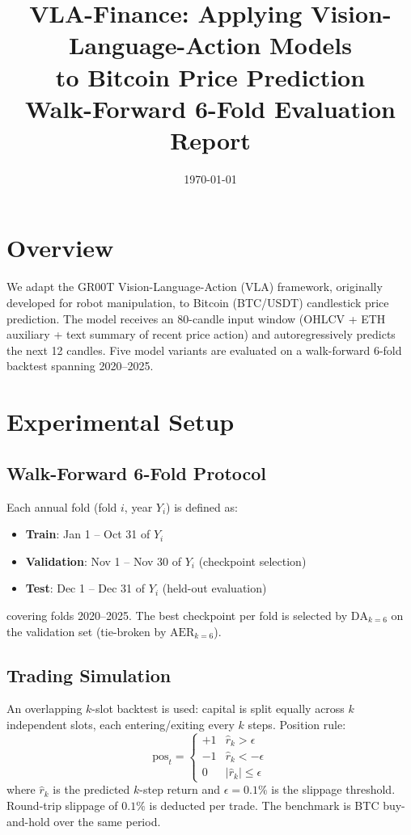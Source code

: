 \documentclass[11pt,a4paper]{article}
\title{\textbf{VLA-Finance: Applying Vision-Language-Action Models\\
to Bitcoin Price Prediction}\\[4pt]
\large Walk-Forward 6-Fold Evaluation Report}
\author{}
\date{\today}
\begin{document}
\maketitle
\thispagestyle{empty}

\section{Overview}

We adapt the GR00T Vision-Language-Action (VLA) framework, originally developed for robot manipulation, to Bitcoin (BTC/USDT) candlestick price prediction.
The model receives an 80-candle input window (OHLCV + ETH auxiliary + text summary of recent price action) and autoregressively predicts the next 12 candles.
Five model variants are evaluated on a walk-forward 6-fold backtest spanning 2020--2025.

\section{Experimental Setup}

\subsection{Walk-Forward 6-Fold Protocol}

Each annual fold (fold $i$, year $Y_i$) is defined as:
\begin{itemize}[noitemsep]
  \item \textbf{Train}: Jan 1 -- Oct 31 of $Y_i$
  \item \textbf{Validation}: Nov 1 -- Nov 30 of $Y_i$ \quad (checkpoint selection)
  \item \textbf{Test}: Dec 1 -- Dec 31 of $Y_i$ \quad (held-out evaluation)
\end{itemize}
covering folds 2020--2025.
The best checkpoint per fold is selected by $\text{DA}_{k=6}$ on the validation set (tie-broken by $\text{AER}_{k=6}$).

\subsection{Trading Simulation}

An overlapping $k$-slot backtest is used: capital is split equally across $k$ independent slots, each entering/exiting every $k$ steps.
Position rule:
\[
  \text{pos}_t =
  \begin{cases}
    +1 & \hat{r}_{k} > \epsilon \\
    -1 & \hat{r}_{k} < -\epsilon \\
    0  & |\hat{r}_{k}| \leq \epsilon
  \end{cases}
\]
where $\hat{r}_{k}$ is the predicted $k$-step return and $\epsilon = 0.1\%$ is the slippage threshold.
Round-trip slippage of $0.1\%$ is deducted per trade. The benchmark is BTC buy-and-hold over the same period.
\end{document}
